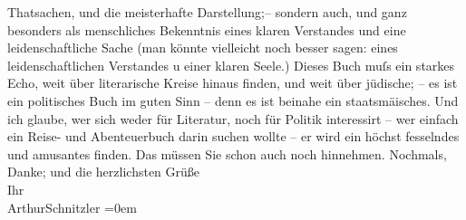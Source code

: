 \begin{ledgroupsized}[t]{13cm}
               Thatsachen, und die meisterhafte Darstellung;– sondern auch, und ganz besonders als
               menschliches Bekenntnis eines klaren Verstandes und eine leidenschaftliche Sache (man
               könnte vielleicht noch besser sagen: eines leidenschaftlichen Verstandes u einer
               klaren Seele.) Dieses Buch
               muſs ein starkes Echo, weit über literarische Kreise hinaus finden, und weit über
               jüdische; – es ist ein politisches Buch im guten Sinn – denn es ist beinahe ein
                  staatsmä{\geminationn}isches. Und ich glaube, wer sich weder für
               Literatur, noch {\pb}für Politik interessirt –
               wer einfach ein Reise- und Abenteuerbuch darin \strikeout{\textcolor{gray}{finden}} suchen wollte – er wird ein höchst fesselndes und amusantes \strikeout{\textcolor{gray}{darin}} finden. Das müssen Sie schon
               auch noch hinnehmen.\pend
           \pstart
           Nochmals, Danke; und die herzlichsten Grüße {\\[\baselineskip]}Ihr {\\[\baselineskip]}\spacefill\mbox{ArthurSchnitzler}\pend
           \leftskip=0em{}
         
         \endnumbering{}\end{ledgroupsized}  \newcommand{\dateiname}{L03021}\newcommand{\titel}{Arthur Schnitzler an Felix Salten, 6. 5. 1925}\newcommand{\editorInnen}{Martin Anton Müller und Laura Untner}
      
